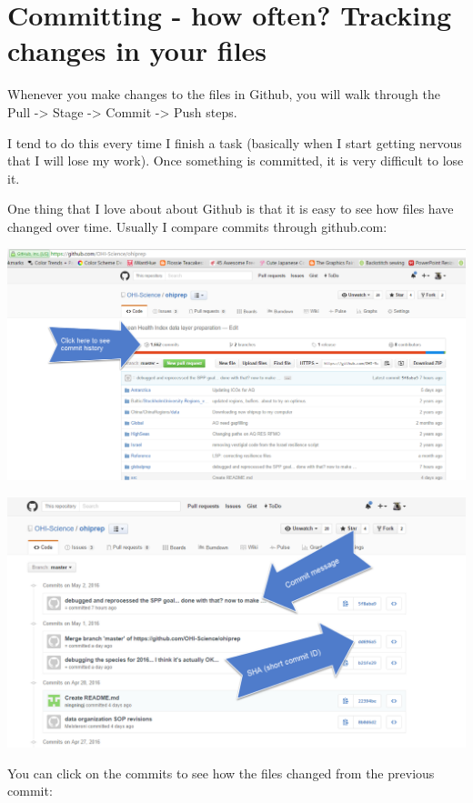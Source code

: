 \documentclass[]{book}
\begin{document}
\hypertarget{committing---how-often-tracking-changes-in-your-files}{%
\section{Committing - how often? Tracking changes in your files}\label{committing---how-often-tracking-changes-in-your-files}}

Whenever you make changes to the files in Github, you will walk through the Pull -\textgreater{} Stage -\textgreater{} Commit -\textgreater{} Push steps.

I tend to do this every time I finish a task (basically when I start getting nervous that I will lose my work). Once something is committed, it is very difficult to lose it.

One thing that I love about about Github is that it is easy to see how files have changed over time. Usually I compare commits through github.com:

\includegraphics{img/commit_history.png}

\includegraphics{img/commit_compare_2.png}

You can click on the commits to see how the files changed from the previous commit:
\end{document}
